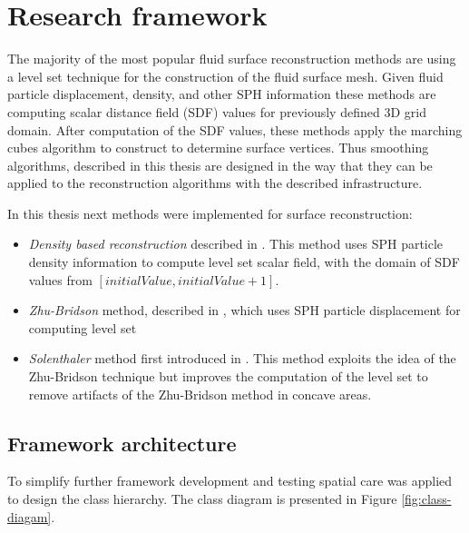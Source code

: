 \chapter{Research framework}
The majority of the most popular fluid surface reconstruction methods are using a level set technique for the construction of the fluid surface mesh. Given fluid particle displacement, density, and other SPH information these methods are computing scalar distance field (SDF) values for previously defined 3D grid domain. After computation of the SDF values, these methods apply the marching cubes algorithm to construct to determine surface vertices.
Thus smoothing algorithms, described in this thesis are designed in the way that they can be applied to the reconstruction algorithms with the described infrastructure.


In this thesis next methods were implemented for surface reconstruction:
\begin{itemize}
  \item \emph{Density based reconstruction} described in \cite{DencRec}. This method uses SPH particle density information to compute level set scalar field, with the domain of SDF values from $[initialValue, initialValue+1]$.
  \item \emph{Zhu-Bridson} method, described in \cite{ZhuBridson}, which uses SPH particle displacement for computing level set
  \item \emph{Solenthaler} method first introduced in \cite{Solenthaler}. This method exploits the idea of the Zhu-Bridson technique but improves the computation of the level set to remove artifacts of the Zhu-Bridson method in concave areas.
\end{itemize}



\section{Framework architecture}
To simplify further framework development and testing spatial care was applied to design the class hierarchy. The class diagram is presented in Figure \ref{fig:class-diagam}.

